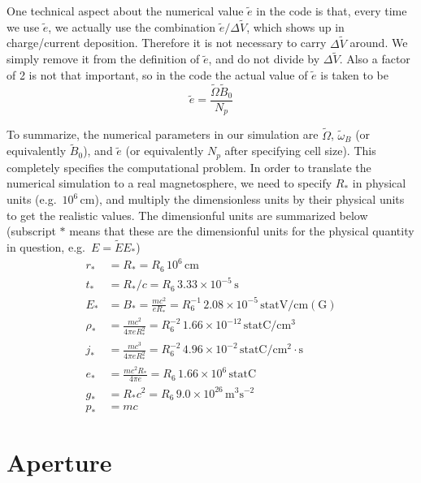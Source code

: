 One technical aspect about the numerical value $\tilde{e}$ in the code is that,
every time we use $\tilde{e}$, we actually use the combination $\tilde{e}/\Delta
\tilde{V}$, which shows up in charge/current deposition. Therefore it is not
necessary to carry $\Delta \tilde{V}$ around. We simply remove it from the
definition of $\tilde{e}$, and do not divide by $\Delta \tilde{V}$. Also a
factor of 2 is not that important, so in the code the actual value of
$\tilde{e}$ is taken to be
\begin{equation}
    \tilde{e} = \frac{\tilde{\Omega} \tilde{B}_0}{N_{p}}
\end{equation}

To summarize, the numerical parameters in our simulation are $\tilde{\Omega}$,
$\tilde{\omega}_B$ (or equivalently $\tilde{B}_{0}$), and $\tilde{e}$ (or
equivalently $N_p$ after specifying cell size). This completely specifies the
computational problem. In order to translate the numerical simulation to a real
magnetosphere, we need to specify $R_{*}$ in physical units (e.g.\ $10^6\,
\mathrm{cm}$), and multiply the dimensionless units by their physical units to
get the realistic values. The dimensionful units are summarized below (subscript
$*$ means that these are the dimensionful units for the physical quantity in
question, e.g.\ $E = \tilde{E} E_*$)
\begin{align}
  r_{*} &= R_{*} = R_6\, 10^6\, \mathrm{cm} \\
  t_{*} &= R_{*} / c = R_6\,3.33\times 10^{-5}\, \mathrm{s} \\
  E_{*} &= B_{*} = \frac{mc^2}{eR_{*}} = R_6^{-1}\, 2.08\times 10^{-5}\, \mathrm{statV/cm(G)} \\
  \rho_{*} &= \frac{mc^2}{4\pi eR_{*}^2} = R_{6}^{-2}\, 1.66\times 10^{-12}\, \mathrm{statC/cm^3} \\
  j_{*} &= \frac{mc^3}{4\pi eR_{*}^2} = R_{6}^{-2}\, 4.96\times 10^{-2}\, \mathrm{statC/cm^2\cdot s}  \\
  e_{*} &= \frac{mc^2R_{*}}{4\pi e} = R_6\, 1.66\times 10^6\, \mathrm{statC} \\
  g_{*} &= R_{*}c^2 = R_6\, 9.0\times 10^{26}\, \mathrm{m^3s^{-2}} \\
  p_{*} &= mc
\end{align}

\section{Aperture}
\label{sec:code-aperture}

